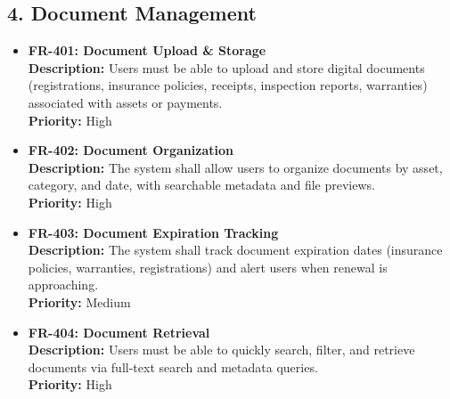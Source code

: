 \documentclass[11pt, a4paper]{article}
\newcommand{\reqid}[1]{\textbf{\color{PrimaryColor}#1}}
\begin{document}
	\subsection{4. Document Management}
	\begin{itemize}
		\item \reqid{FR-401: Document Upload \& Storage} \\
		\textbf{Description:} Users must be able to upload and store digital documents (registrations, insurance policies, receipts, inspection reports, warranties) associated with assets or payments. \\
		\textbf{Priority:} High
		
		\item \reqid{FR-402: Document Organization} \\
		\textbf{Description:} The system shall allow users to organize documents by asset, category, and date, with searchable metadata and file previews. \\
		\textbf{Priority:} High
		
		\item \reqid{FR-403: Document Expiration Tracking} \\
		\textbf{Description:} The system shall track document expiration dates (insurance policies, warranties, registrations) and alert users when renewal is approaching. \\
		\textbf{Priority:} Medium
		
		\item \reqid{FR-404: Document Retrieval} \\
		\textbf{Description:} Users must be able to quickly search, filter, and retrieve documents via full-text search and metadata queries. \\
		\textbf{Priority:} High
	\end{itemize}
	
\end{document}
